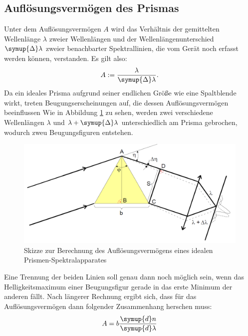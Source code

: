 \subsection{Auflösungsvermögen des Prismas}
Unter dem Auflösungsvermögen $A$ wird das Verhältnis der gemittelten Wellenlänge $\lambda$ zweier Wellenlängen und der Wellenlängenunterschied $\symup{\Delta} \lambda$ zweier benachbarter Spektrallinien,
die vom Gerät noch erfasst werden können, verstanden.
Es gilt also:
\begin{equation}
  A := \frac{\lambda}{\symup{\Delta} \lambda} \text{.}
\end{equation}
Da ein ideales Prisma aufgrund seiner endlichen Größe wie eine Spaltblende wirkt, treten Beugungserscheinungen auf, die dessen Auflösungsvermögen
beeinflussen
Wie in Abbildung \ref{fig:ALV} zu sehen, werden zwei verschiedene Wellenlängen $\lambda$ und $\lambda+\symup{\Delta} \lambda$ unterschiedlich am Prisma gebrochen, wodurch zweu Beugungsfiguren entstehen.
\begin{figure}[H]
  \centering
  \includegraphics[scale=0.35]{Text/Bilder/Aufloesungsvermoegen.png}
  \caption{Skizze zur Berechnung des Auflösungsvermögens eines idealen Prismen-Spektralapparates \cite[28]{sample}}
  \label{fig:ALV}
\end{figure}
Eine Trennung der beiden Linien soll genau dann noch möglich sein, wenn das Helligkeitsmaximum
einer Beugungsfigur gerade in das erste Minimum der anderen fällt.
Nach längerer Rechnung ergibt sich, dass für das Auflösungsvermögen dann folgender Zusammenhang herschen muss:
\begin{equation}
  A = b\frac{\symup{d}n}{\symup{d}\lambda}\label{eq:A}
\end{equation}

